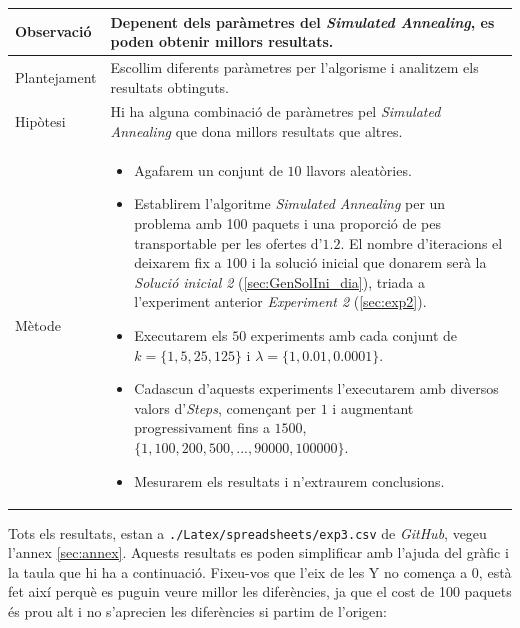 \documentclass[a4paper]{article}
\begin{document}
	\begin{table}[ht]
		\centering
		\begin{tabular}{|l|p{10cm}|}
			\hline
			Observació & Depenent dels paràmetres del \textit{Simulated Annealing}, es poden obtenir millors resultats. \\
			\hline
			Plantejament & Escollim diferents paràmetres per l'algorisme i analitzem els resultats obtinguts. \\
			\hline
			Hipòtesi & Hi ha alguna combinació de paràmetres pel \textit{Simulated Annealing} que dona millors resultats que altres.\\
			\hline
			Mètode &
			\begin{itemize}
				\item Agafarem un conjunt de $10$ llavors aleatòries.
				\item Establirem l'algoritme \textit{Simulated Annealing} per un problema amb 100 paquets i una proporció de pes transportable per les ofertes d'$1.2$. El nombre d'iteracions el deixarem fix a $100$ i la solució inicial que donarem serà la \textit{Solució inicial 2} (\ref{sec:GenSolIni_dia}), triada a l'experiment anterior \textit{Experiment 2} (\ref{sec:exp2}).
				\item Executarem els $50$ experiments amb cada conjunt de $k=\{1, 5, 25, 125\}$ i $\lambda = \{1, 0.01, 0.0001\}$.
				\item Cadascun d'aquests experiments l'executarem amb diversos valors d'\textit{Steps}, començant per $1$ i augmentant progressivament fins a $1500$, $\{1, 100, 200, 500, ... , 90000, 100000\}$. 
				\item Mesurarem els resultats i n'extraurem conclusions.
			\end{itemize} \\
			\hline
		\end{tabular}
		\label{tab:exp3_apartats}
	\end{table}
	
	Tots els resultats, estan a \texttt{./Latex/spreadsheets/exp3.csv} de \textit{GitHub}, vegeu l'annex \ref{sec:annex}. Aquests resultats es poden simplificar amb l'ajuda del gràfic i la taula que hi ha a continuació. Fixeu-vos que l'eix de les Y no comença a 0, està fet així perquè es puguin veure millor les diferències, ja que el cost de 100 paquets és prou alt i no s'aprecien les diferències si partim de l'origen:
	
\end{document}
